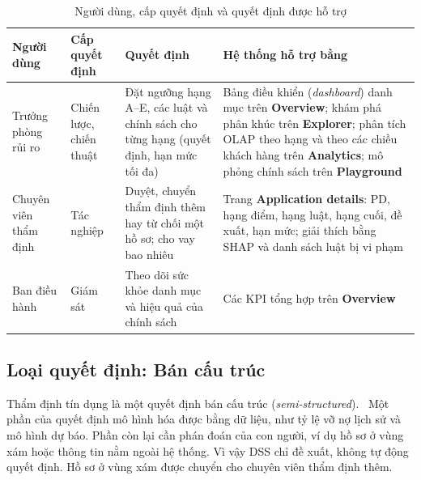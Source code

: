 \begin{table}[H]
	\centering
	\caption{Người dùng, cấp quyết định và quyết định được hỗ trợ}
	\label{tab:user-decision-levels}
	\footnotesize
	\begin{tabular}{p{2.8cm} p{2cm} p{4.8cm} p{5.4cm}}
		\toprule
		\textbf{Người dùng}   & \textbf{Cấp quyết định} & \textbf{Quyết định}                                                                     & \textbf{Hệ thống hỗ trợ bằng}                                                                                                                                                                                                                \\
		\midrule
		Trưởng phòng rủi ro   & Chiến lược, chiến thuật & Đặt ngưỡng hạng A--E, các luật và chính sách cho từng hạng (quyết định, hạn mức tối đa) & Bảng điều khiển (\textit{dashboard}) danh mục trên \textbf{Overview}; khám phá phân khúc trên \textbf{Explorer}; phân tích OLAP theo hạng và theo các chiều khách hàng trên \textbf{Analytics}; mô phỏng chính sách trên \textbf{Playground} \\
		\midrule
		Chuyên viên thẩm định & Tác nghiệp              & Duyệt, chuyển thẩm định thêm hay từ chối một hồ sơ; cho vay bao nhiêu                   & Trang \textbf{Application details}: PD, hạng điểm, hạng luật, hạng cuối, đề xuất, hạn mức; giải thích bằng SHAP và danh sách luật bị vi phạm                                                                                                 \\
		\midrule
		Ban điều hành         & Giám sát                & Theo dõi sức khỏe danh mục và hiệu quả của chính sách                                   & Các KPI tổng hợp trên \textbf{Overview}                                                                                                                                                                                                      \\
		\bottomrule
	\end{tabular}
\end{table}

\subsection{Loại quyết định: Bán cấu trúc}
\label{sec:semi-structured}
Thẩm định tín dụng là một quyết định bán cấu trúc (\textit{semi-structured}).~\cite{turban2005} Một phần của quyết định mô hình hóa được bằng dữ liệu, như tỷ lệ vỡ nợ lịch sử và mô hình dự báo. Phần còn lại cần phán đoán của con người, ví dụ hồ sơ ở vùng xám hoặc thông tin nằm ngoài hệ thống. Vì vậy DSS chỉ đề xuất, không tự động quyết định. Hồ sơ ở vùng xám được chuyển cho chuyên viên thẩm định thêm.

